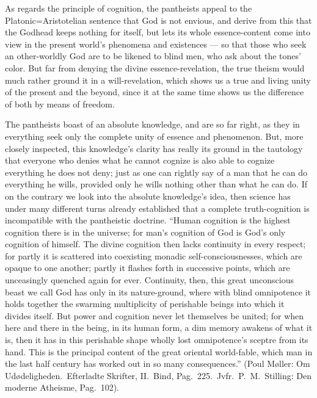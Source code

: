\documentclass[12pt]{book}
\begin{document}
As regards the principle of cognition, the pantheists appeal to the
Platonic=Aristotelian sentence that God is not envious, and derive from this
that the Godhead keeps nothing for itself, but lets its whole
essence-content come into view in the present world's phenomena and
existences --- so that those who seek an other-worldly God are to be likened
to blind men, who ask about the tones' color. But far from denying the
divine essence-revelation, the true theism would much rather ground it in a
will-revelation, which shows us a true and living unity of the present and
the beyond, since it at the same time shows us the difference of both by
means of freedom.

The pantheists boast of an absolute knowledge, and are so far right, as they
in everything seek only the complete unity of essence and phenomenon. But,
more closely inspected, this knowledge's clarity has really its ground in
the tautology that everyone who denies what he cannot cognize is also able
to cognize everything he does not deny; just as one can rightly say of a man
that he can do everything he wills, provided only he wills nothing other
than what he can do. If on the contrary we look into the absolute
knowledge's idea, then science has under many different turns already
established that a complete truth-cognition is incompatible with the
pantheistic doctrine. ``Human cognition is the highest cognition there is in
the universe; for man's cognition of God is God's only cognition of himself.
The divine cognition then lacks continuity in every respect; for partly it
is scattered into coexisting monadic self-consciousnesses, which are opaque
to one another; partly it flashes forth in successive points, which are
unceasingly quenched again for ever. Continuity, then, this great
unconscious beast we call God has only in its nature-ground, where with
blind omnipotence it holds together the swarming multiplicity of perishable
beings into which it divides itself. But power and cognition never let
themselves be united; for when here and there in the being, in its human
form, a dim memory awakens of what it is, then it has in this perishable
shape wholly lost omnipotence's sceptre from its hand. This is the principal
content of the great oriental world-fable, which man in the last half
century has worked out in so many consequences.'' (Poul Møller: Om
Udødeligheden.\ Efterladte Skrifter, II.\ Bind, Pag.\ 225.\ Jvfr.\ P.\ M.\
Stilling: Den moderne Atheisme, Pag.\ 102).
\end{document}
